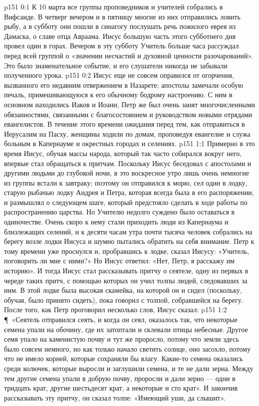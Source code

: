 \author{Комиссия срединников}
\vs p151 0:1 К 10 марта все группы проповедников и учителей собрались в Вифсаиде. В четверг вечером и в пятницу многие из них отправились ловить рыбу, а в субботу они пошли в синагогу послушать речь пожилого еврея из Дамаска, о славе отца Авраама. Иисус большую часть этого субботнего дня провел один в горах. Вечером в эту субботу Учитель больше часа рассуждал перед всей группой о «значении несчастий и духовной ценности разочарований». Это было знаменательное событие, и его слушатели никогда не забывали полученного урока.
\vs p151 0:2 Иисус еще не совсем оправился от огорчения, вызванного его недавним отвержением в Назарете; апостолы замечали особую печаль, примешивающуюся к его обычному бодрому настроению. С ним в основном находились Иаков и Иоанн, Петр же был очень занят многочисленными обязанностями, связанными с благосостоянием и руководством новыми отрядами евангелистов. В течение этого времени ожидания перед тем, как отправиться в Иерусалим на Пасху, женщины ходили по домам, проповедуя евангелие и служа больным в Капернауме и окрестных городах и селениях.
\vs p151 1:1 Примерно в это время Иисус, обучая массы народа, который так часто собирался вокруг него, впервые стал обращаться к притчам. Поскольку Иисус беседовал с апостолами и другими людьми до глубокой ночи, в это воскресное утро лишь очень немногие из группы встали к завтраку; поэтому он отправился к морю, сел один в лодку, старую рыбачью лодку Андрея и Петра, которая всегда была в его распоряжении, и размышлял о следующем шаге, который предстояло сделать в ходе работы по распространению царства. Но Учителю недолго суждено было оставаться в одиночестве. Очень скоро к нему стали приходить люди из Капернаума и близлежащих селений, и к десяти часам утра почти тысяча человек собрались на берегу возле лодки Иисуса и шумно пытались обратить на себя внимание. Петр к тому времени уже проснулся и, пробравшись к лодке, сказал Иисусу: «Учитель, поговорить ли мне с ними?» Но Иисус ответил: «Нет, Петр, я расскажу им историю». И тогда Иисус стал рассказывать притчу о сеятеле, одну из первых в череде таких притч, с помощью которых он учил толпы людей, следовавших за ним. В этой лодке была высокая скамейка, на которой он и сидел (поскольку, обучая, было принято сидеть), пока говорил с толпой, собравшейся на берегу. После того, как Петр проговорил несколько слов, Иисус сказал:
\vs p151 1:2 \P\ «Сеятель отправился сеять, и когда он сеял, оказалось так, что некоторые семена упали на обочину, где их затоптали и склевали птицы небесные. Другое семя упало на каменистую почву и тут же проросло, потому что земли здесь было совсем немного, но как только начало светить солнце, оно засохло, потому что не имело корней, которые сохраняли бы влагу. Какие\hyp{}то семена оказались среди колючек, которые выросли и заглушили семена, и те не дали зерна. Между тем другие семена упали в добрую почву, проросли и дали зерно --- одни в тридцать крат, другие шестьдесят крат, а некоторые и сто крат». И закончив рассказывать эту притчу, он сказал толпе: «Имеющий уши, да слышит».

